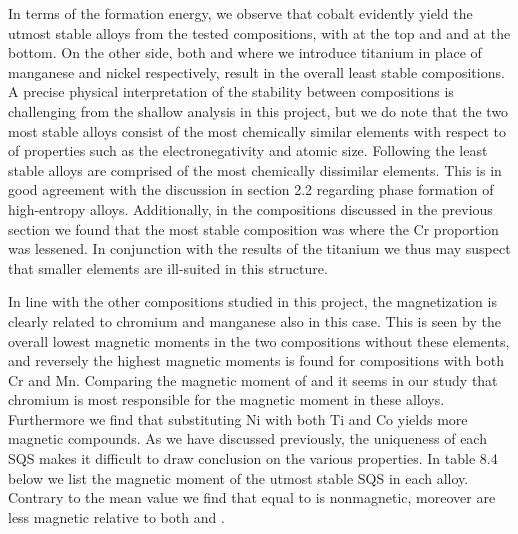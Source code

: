 In terms of the formation energy, we observe that cobalt evidently yield the utmost stable alloys from the tested compositions, with  at the top and and  at the bottom. On the other side, both  and  where we introduce titanium in place of manganese and nickel respectively, result in the overall least stable compositions. A precise physical interpretation of the stability between compositions is challenging from the shallow analysis in this project, but we do note that the two most stable alloys consist of the most chemically similar elements with respect to of properties such as the electronegativity and atomic size. Following the least stable alloys are comprised of the most chemically dissimilar elements. This is in good agreement with the discussion in section 2.2 regarding phase formation of high-entropy alloys. Additionally, in the compositions discussed in the previous section we found that the most stable composition was  where the Cr proportion was lessened. In conjunction with the results of the titanium we thus may suspect that smaller elements are ill-suited in this structure.   

In line with the other compositions studied in this project, the magnetization is clearly related to chromium and manganese also in this case. This is seen by the overall lowest magnetic moments in the two compositions without these elements, and reversely the highest magnetic moments is found for compositions with both Cr and Mn. Comparing the magnetic moment of  and  it seems in our study that chromium is most responsible for the magnetic moment in these alloys. Furthermore we find that substituting Ni with both Ti and Co yields more magnetic compounds. As we have discussed previously, the uniqueness of each SQS makes it difficult to draw conclusion on the various properties. In table 8.4 below we list the magnetic moment of the utmost stable SQS in each alloy. Contrary to the mean value we find that  equal to  is nonmagnetic, moreover  are less magnetic relative to both  and . 

